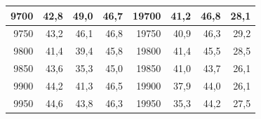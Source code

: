 \begin{small}
\begin{longtable}{|r|r|r|r|r|r|r|r|}
9700 & 42,8 & 49,0 & 46,7 & 19700 & 41,2 & 46,8 & 28,1 \\ \hline
9750 & 43,2 & 46,1 & 46,8 & 19750 & 40,9 & 46,3 & 29,2 \\ \hline
9800 & 41,4 & 39,4 & 45,8 & 19800 & 41,4 & 45,5 & 28,5 \\ \hline
9850 & 43,6 & 35,3 & 45,0 & 19850 & 41,0 & 43,7 & 26,1 \\ \hline
9900 & 44,2 & 41,3 & 46,5 & 19900 & 37,9 & 44,0 & 26,1 \\ \hline
9950 & 44,6 & 43,8 & 46,3 & 19950 & 35,3 & 44,2 & 27,5 \\ \hline
\end{longtable}
\end{small}